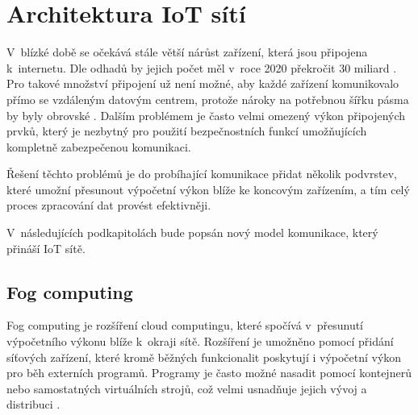 \section{Architektura IoT sítí}
  V~blízké době se očekává stále větší nárůst zařízení, která jsou připojena k~internetu.
  Dle odhadů by jejich počet měl v~roce 2020 překročit 30 miliard \cite{iotDevices}.
  Pro takové množství připojení už není možné, aby každé zařízení komunikovalo přímo
  se vzdáleným datovým centrem, protože nároky na potřebnou šířku pásma by byly 
  obrovské \cite{fog}.
  Dalším problémem je často velmi omezený výkon připojených prvků, který je nezbytný pro 
  použití bezpečnostních funkcí umožňujících kompletně zabezpečenou komunikaci. 
  
  Řešení těchto problémů je do probíhající komunikace přidat několik podvrstev, 
  které umožní přesunout výpočetní výkon blíže ke koncovým zařízením, a tím celý
  proces zpracování dat provést efektivněji.
  
  V~následujících podkapitolách bude popsán nový model komunikace, který přináší 
  IoT sítě.
 \subsection{Fog computing} 
 Fog computing je rozšíření cloud computingu, které spočívá v~přesunutí výpočetního
 výkonu blíže k~okraji sítě. Rozšíření je umožněno pomocí přidání síťových zařízení,
 které kromě běžných funkcionalit poskytují i výpočetní výkon pro běh externích programů. Programy 
 je často možné nasadit pomocí kontejnerů nebo samostatných virtuálních strojů, což 
 velmi usnadňuje jejich vývoj a distribuci \cite{fog}.
 

